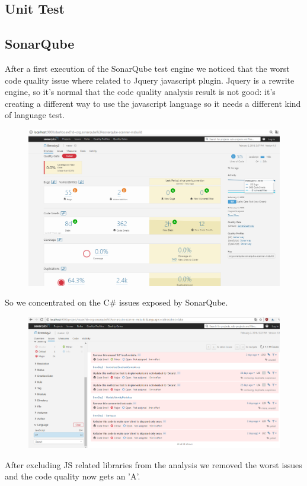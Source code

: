 \documentclass[12pt]{article}
\begin{document}
\subsection{Unit Test}
\subsection{SonarQube}

After a first execution of the SonarQube test engine we noticed that the worst code quality issue where related to Jquery javascript plugin.
Jquery is a rewrite engine, so it's normal that the code quality analysis result is not good: it's creating a different way
to use the javascript language so it needs a different kind of language test.
\begin{figure}[H]
\includegraphics[scale=0.5]{sonar1.png}
\end{figure}
So we concentrated on the C\# issues exposed by SonarQube.
\begin{figure}[H]
\includegraphics[scale=0.5]{sonar2.png}
\end{figure}
After excluding JS related libraries from the analysis we removed the worst issues and the code quality now gets an 'A'.
\end{document}
